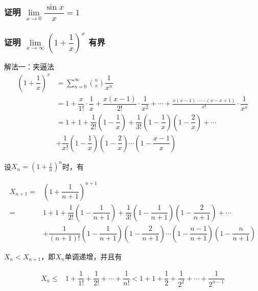 \documentclass[a4paper, 12pt, draft]{article}
\begin{document}
    \subsubsection{证明 $ \lim\limits_{x \to 0 } \dfrac{\sin{x}}{x} = 1 $}


    \subsubsection{证明 $\lim\limits_{x \to \infty} \left( 1 + \dfrac{1}{x} \right)^{x}$ 有界}

    解法一：夹逼法
    \begin{equation*}
        \begin{aligned}
            \left( 1 + \dfrac{1}{x} \right)^{x} &= \sum\limits_{n = 0}^{\infty} \binom{n}{x} \dfrac{1}{x^n} \\
                        &= 1 + \dfrac{x}{1!} \cdot \dfrac{1}{x} + \dfrac{x(x-1)}{2!} \cdot \dfrac{1}{x^2} + \cdots + \frac{x(x-1)\cdot \cdots \cdot (x - x + 1)}{x!} \cdot \dfrac{1}{x^x} \\ 
                        &= 1 + 1 + \dfrac{1}{2!} \left( 1 - \dfrac{1}{x}  \right) + \dfrac{1}{3!} \left(1 - \dfrac{1}{x} \right)\left(1 - \dfrac{2}{x} \right) + \cdots \\
                        & + \dfrac{1}{x!} \left(1 - \dfrac{1}{x} \right)\left(1 - \dfrac{2}{x} \right) \cdots \left(1 - \dfrac{x - 1}{x} \right)
        \end{aligned}
    \end{equation*}
    
    设$X_n = \left(1+ \frac{1}{n}\right)^n$时，有

    \begin{equation*}
        \begin{aligned}
            X_{n+1} = &\left( 1 + \dfrac{1}{n+1} \right)^{n+1} \\
                = & 1 + 1 + \dfrac{1}{2!} \left( 1 - \dfrac{1}{n+1}  \right) + \dfrac{1}{3!} \left(1 - \dfrac{1}{n+1} \right)\left(1 - \dfrac{2}{n+1} \right) + \cdots \\
                & + \dfrac{1}{(n+1)!} \left(1 - \dfrac{1}{n+1} \right)\left(1 - \dfrac{2}{n+1} \right) \cdots \left(1 - \dfrac{n - 1}{n+1} \right)\left(1 - \dfrac{n}{n+1} \right)
        \end{aligned}
    \end{equation*}
    
    
    $X_n < X_{n+1}$，即$X_{n}$单调递增，并且有
    
    \[
    \begin{aligned}
        X_n \leq & 1 + \dfrac{1}{1!} + \dfrac{1}{2!} + \cdots + \dfrac{1}{n!} < 1 + 1 + \dfrac{1}{2}
        + \dfrac{1}{2^2} + \cdots + \dfrac{1}{2^{n-1}}
    \end{aligned}
    \]
    
\end{document}
